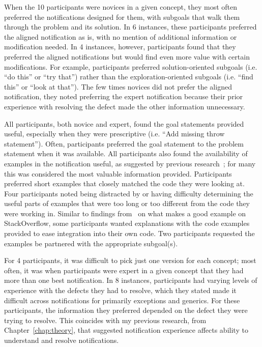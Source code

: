 When the 10 participants were novices in a given concept, they most often preferred the notifications designed for them, with subgoals that walk them through the problem and its solution.
In 6 instances, these participants preferred the aligned notification as is, with no mention of additional information or modification needed. 
In 4 instances, however, participants found that they preferred the aligned notifications but would find even more value with certain modifications.
For example, participants preferred solution-oriented subgoals (i.e. ``do this'' or ``try that'') rather than the exploration-oriented subgoals (i.e. ``find this'' or ``look at that'').
The few times novices did not prefer the aligned notification, they noted preferring the expert notification because their prior experience with resolving the defect made the other information unnecessary.


All participants, both novice and expert, found the goal statements provided useful, especially when they were prescriptive (i.e. ``Add missing throw statement'').
Often, participants preferred the goal statement to the problem statement when it was available. 
All participants also found the availability of examples in the notification useful, as suggested by previous research~\cite{nasehi2012makes}; for many this was considered the most valuable information provided. 
Participants preferred short examples that closely matched the code they were looking at. 
Four participants noted being distracted by or having difficulty determining the useful parts of examples that were too long or too different from the code they were working in.
Similar to findings from~\cite{nasehi2012makes} on what makes a good example on StackOverflow, some participants wanted explanations with the code examples provided to ease integration into their own code.
Two participants requested the examples be partnered with the appropriate subgoal(s).


For 4 participants, it was difficult to pick just one version for each concept; most often, it was when participants were expert in a given concept that they had more than one best notification.
In 8 instances, participants had varying levels of experience with the defects they had to resolve, which they stated made it difficult across notifications for primarily exceptions and generics. 
For these participants, the information they preferred depended on the defect they were trying to resolve. This coincides with my previous research, from Chapter~\ref{chap:theory}, that suggested notification experience affects ability to understand and resolve notifications.


